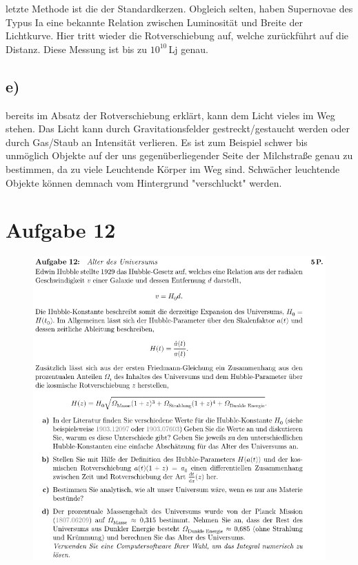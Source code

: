     \justifying letzte Methode ist die der Standardkerzen. Obgleich selten, haben Supernovae des Typus Ia eine bekannte 
    Relation zwischen Luminosität und Breite der Lichtkurve. Hier tritt wieder die Rotverschiebung auf, welche zurückführt auf die Distanz. 
    Diese Messung ist bis zu $10^{10}\,$Lj genau. 

    \subsection{e)}

    \justifying bereits im Absatz der Rotverschiebung erklärt, kann dem Licht vieles im Weg stehen. Das Licht kann
    durch Gravitationsfelder gestreckt/gestaucht werden oder durch Gas/Staub an Intensität verlieren. Es ist zum Beispiel schwer bis 
    unmöglich Objekte auf der uns gegenüberliegender Seite der Milchstraße genau zu bestimmen, da zu viele Leuchtende Körper im Weg sind.
    Schwächer leuchtende Objekte können demnach vom Hintergrund "verschluckt" \;werden. 

\section{Aufgabe 12}

    \begin{figure}[H]
        \centering
        \includegraphics[width=\textwidth]{images/Aufgabe12.jpg}
        \label{fig:6}
    \end{figure}


